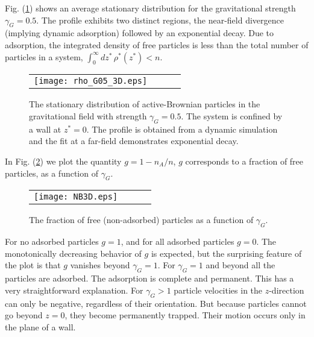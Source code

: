 \documentclass[pre,twocolumn,graphicx]{revtex4-1}
\begin{document}
Fig. (\ref{fig:rho}) shows an average stationary distribution for the gravitational strength $\gamma_G=0.5$.  
The profile exhibits two distinct regions, the near-field divergence (implying dynamic adsorption) 
followed by an exponential decay.  
Due to adsorption, the integrated density of free particles is less than the  
total number of particles in a system, $\int_0^{\infty}dz^*\,\rho^*(z^*)<n$.  
\graphicspath{{figures/}}
\begin{figure}[h] 
 \begin{center}
 \begin{tabular}{rrrr}
  \texttt{[image: rho\_G05\_3D.eps]}&
 \end{tabular}
 \end{center}
\caption{The stationary distribution of active-Brownian particles in the 
gravitational field with strength $\gamma_G=0.5$.  The system is confined by a wall 
at $z^*=0$. The profile is obtained from a dynamic simulation and the fit at a far-field 
demonstrates exponential decay.  }
\label{fig:rho} 
\end{figure}




In Fig. (\ref{fig:NA}) we plot the quantity $g=1-n_A/n$, $g$ corresponds to a fraction of free particles, 
as a function of $\gamma_G$.  
\graphicspath{{figures/}}
\begin{figure}[h] 
 \begin{center}
 \begin{tabular}{rrrr}
  \texttt{[image: NB3D.eps]}&
 \end{tabular}
 \end{center}
\caption{The fraction of free (non-adsorbed) particles as a function of $\gamma_G$. } 
\label{fig:NA} 
\end{figure}
For no adsorbed particles $g=1$, and for all adsorbed particles $g=0$.   
The monotonically decreasing behavior of $g$ is expected, but the surprising feature of the plot 
is that $g$ vanishes beyond $\gamma_G=1$.  For $\gamma_G=1$ and beyond all the particles 
are adsorbed.  The adsorption is complete and permanent.  This has a very straightforward explanation.  
For $\gamma_G>1$ particle velocities in the $z$-direction can only be negative, regardless of their 
orientation.  But because particles cannot go beyond $z=0$, they become permanently trapped.  
Their motion occurs only in the plane of a wall.   
\end{document}
